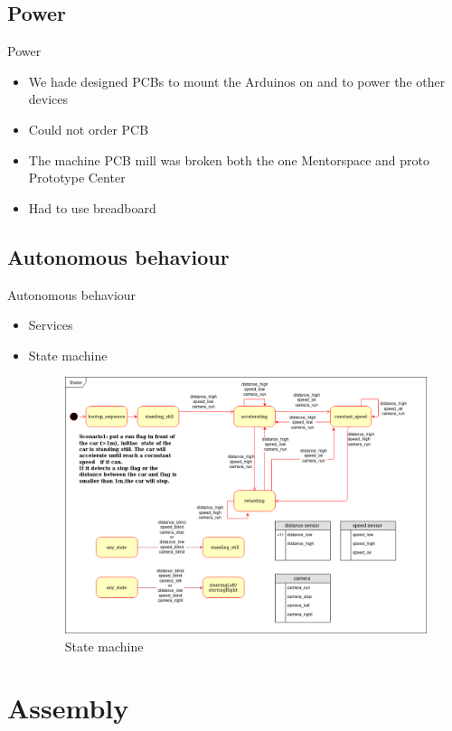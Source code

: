 \documentclass{beamer}
\begin{document}
\subsection{Power}
\begin{frame}{Power}
    \begin{itemize}
        \item We hade designed PCBs to mount the Arduinos on and to power the other devices
        \item Could not order PCB
        \item The machine PCB mill was broken both the one Mentorspace and proto Prototype Center
        \item Had to use breadboard 
    \end{itemize}
\end{frame}



\subsection{Autonomous behaviour}
\begin{frame}{Autonomous behaviour}
 \begin{itemize}
  \item Services
  \item State machine
  \begin{figure}
    \includegraphics[width=0.7\linewidth]{statemachine.png}
    \caption{State machine}
  \end{figure}
 \end{itemize}

\end{frame}

\section{Assembly}
\end{document}
